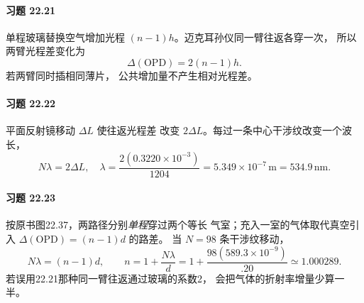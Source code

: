 \paragraph{习题 22.21}
单程玻璃替换空气增加光程
\((n-1)h\)。迈克耳孙仪同一臂往返各穿一次，
所以两臂光程差变化为
\[
\boxed{\Delta(\mathrm{OPD})=2(n-1)h}.
\]
若两臂同时插相同薄片，
公共增加量不产生相对光程差。

\paragraph{习题 22.22}
平面反射镜移动 \(\Delta L\) 使往返光程差
改变 \(2\Delta L\)。每过一条中心干涉纹改变一个波长，
\[
N\lambda=2\Delta L,\quad
\boxed{\lambda=\frac{2(0.3220\times10^{-3})}{1204}
=5.349\times10^{-7}\,\mathrm m
=534.9\,\mathrm{nm}}.
\]

\paragraph{习题 22.23}
按原书图22.37，两路径分别\emph{单程}穿过两个等长
气室；充入一室的气体取代真空引入
\(\Delta(\mathrm{OPD})=(n-1)d\) 的路差。
当 \(N=98\) 条干涉纹移动，
\[
N\lambda=(n-1)d,\qquad
\boxed{n=1+\frac{N\lambda}{d}
=1+\frac{98(589.3\times10^{-9})}{.20}
\simeq1.000289}.
\]
若误用22.21那种同一臂往返通过玻璃的系数2，
会把气体的折射率增量少算一半。
